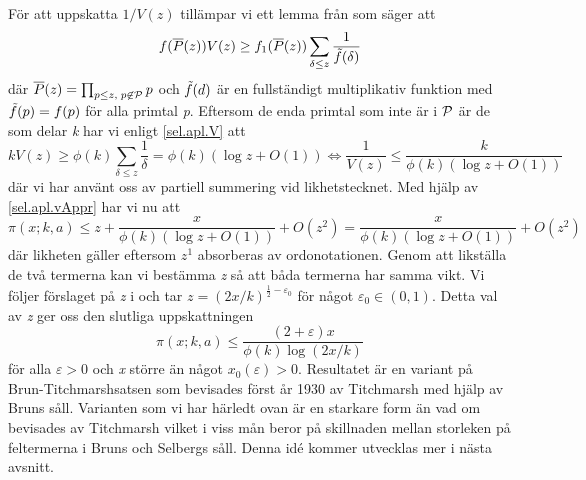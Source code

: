 För att uppskatta \(1/V(z)\) tillämpar vi ett lemma från \cite[Lemma 7.2.3]{cojocarumurty} som säger att
\begin{equation}
    f(\overline{P}(z))V(z) \geq f_1(\overline{P}(z))\sum_{\delta \leq z}\frac{1}{\Tilde{f}(\delta)}\label{sel.apl.V}
\end{equation}
där \(\overline{P}(z) = \prod_{p\leq z,\; p \not \in \P}p\) och \(\Tilde{f}(d)\) är en fullständigt multiplikativ funktion med \(\Tilde{f}(p) = f(p)\) för alla primtal \textit{p}. 
Eftersom de enda primtal som inte är i \(\P\) är de som delar \textit{k} har vi enligt \eqref{sel.apl.V} att 
\begin{equation}
    kV(z) \geq \phi(k) \sum_{\delta \leq z}\frac{1}{\delta} = \phi(k)(\log z + O(1)) \iff \frac{1}{V(z)} \leq \frac{k}{\phi(k)(\log z + O(1))}\label{sel.apl.vAppr}
\end{equation}
där vi har använt oss av partiell summering vid likhetstecknet. 
Med hjälp av \eqref{sel.apl.vAppr} har vi nu att
\begin{equation}
     \pi(x;k,a) \leq z + \frac{x}{\phi(k)(\log z + O(1))} + O(z^2) = \frac{x}{\phi(k)(\log z + O(1))} + O(z^2)\nonumber
\end{equation}
där likheten gäller eftersom \(z^1\) absorberas av ordonotationen. 
Genom att likställa de två termerna kan vi bestämma \textit{z} så att båda termerna har samma vikt. Vi följer förslaget på \textit{z} i \cite[s. 127]{cojocarumurty} och tar \(z = (2x/k)^{\frac{1}{2}-\varepsilon_0}\) för något \(\varepsilon_0\in(0, 1)\). Detta val av \textit{z} ger oss den slutliga uppskattningen
\begin{equation}
    \pi(x;k,a) \leq \frac{(2+\varepsilon)x}{\phi(k)\log(2x/k)}\nonumber
\end{equation}
för alla \(\varepsilon > 0\) och \textit{x} större än något \(x_0(\varepsilon) >0\). 
Resultatet är en variant på Brun-Titchmarshsatsen som bevisades först år 1930 av Titchmarsh \cite{BrunTitch} med hjälp av Bruns såll.
Varianten som vi har härledt ovan är en starkare form än vad om bevisades av Titchmarsh vilket i viss mån beror på skillnaden mellan storleken på feltermerna i Bruns och Selbergs såll.
Denna idé kommer utvecklas mer i nästa avsnitt.